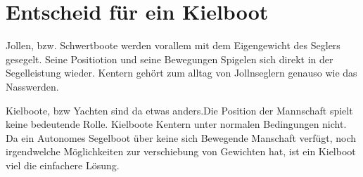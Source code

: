 \section{Entscheid für ein Kielboot}
Jollen, bzw. Schwertboote werden vorallem mit dem Eigengewicht des Seglers gesegelt. Seine Positiotion und seine Bewegungen Spigelen sich direkt in der Segelleistung wieder. Kentern gehört zum alltag von Jollnseglern genauso wie das Nasswerden.

Kielboote, bzw Yachten sind da etwas anders.Die Position der Mannschaft spielt keine bedeutende Rolle. Kielboote Kentern unter normalen Bedingungen nicht. Da ein Autonomes Segelboot über keine sich Bewegende Manschaft verfügt, noch irgendwelche Möglichkeiten zur verschiebung von Gewichten hat, ist ein Kielboot viel die einfachere Lösung.



